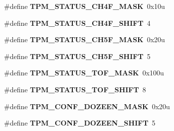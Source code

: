 \begin{DoxyCompactItemize}
\item 
\hypertarget{group___t_p_m___register___masks_ga6d71ec16664cd555736bd39d2b0aef50}{}\#define {\bfseries T\+P\+M\+\_\+\+S\+T\+A\+T\+U\+S\+\_\+\+C\+H4\+F\+\_\+\+M\+A\+S\+K}~0x10u\label{group___t_p_m___register___masks_ga6d71ec16664cd555736bd39d2b0aef50}

\item 
\hypertarget{group___t_p_m___register___masks_gacacfe3eeb25b42db72340d8f7644b293}{}\#define {\bfseries T\+P\+M\+\_\+\+S\+T\+A\+T\+U\+S\+\_\+\+C\+H4\+F\+\_\+\+S\+H\+I\+F\+T}~4\label{group___t_p_m___register___masks_gacacfe3eeb25b42db72340d8f7644b293}

\item 
\hypertarget{group___t_p_m___register___masks_ga0f6acd45c21170be3a793e3fa9107938}{}\#define {\bfseries T\+P\+M\+\_\+\+S\+T\+A\+T\+U\+S\+\_\+\+C\+H5\+F\+\_\+\+M\+A\+S\+K}~0x20u\label{group___t_p_m___register___masks_ga0f6acd45c21170be3a793e3fa9107938}

\item 
\hypertarget{group___t_p_m___register___masks_gaa36c765ce241849df7e9a67665f64493}{}\#define {\bfseries T\+P\+M\+\_\+\+S\+T\+A\+T\+U\+S\+\_\+\+C\+H5\+F\+\_\+\+S\+H\+I\+F\+T}~5\label{group___t_p_m___register___masks_gaa36c765ce241849df7e9a67665f64493}

\item 
\hypertarget{group___t_p_m___register___masks_ga2b3ff7c5c27b1645f2aa20e443bd806c}{}\#define {\bfseries T\+P\+M\+\_\+\+S\+T\+A\+T\+U\+S\+\_\+\+T\+O\+F\+\_\+\+M\+A\+S\+K}~0x100u\label{group___t_p_m___register___masks_ga2b3ff7c5c27b1645f2aa20e443bd806c}

\item 
\hypertarget{group___t_p_m___register___masks_ga5a38aeba334eb7104fc05909881ee482}{}\#define {\bfseries T\+P\+M\+\_\+\+S\+T\+A\+T\+U\+S\+\_\+\+T\+O\+F\+\_\+\+S\+H\+I\+F\+T}~8\label{group___t_p_m___register___masks_ga5a38aeba334eb7104fc05909881ee482}

\item 
\hypertarget{group___t_p_m___register___masks_ga3588ec19d239de2ab13d4305b2beb96a}{}\#define {\bfseries T\+P\+M\+\_\+\+C\+O\+N\+F\+\_\+\+D\+O\+Z\+E\+E\+N\+\_\+\+M\+A\+S\+K}~0x20u\label{group___t_p_m___register___masks_ga3588ec19d239de2ab13d4305b2beb96a}

\item 
\hypertarget{group___t_p_m___register___masks_gad0be3a285e31316fb01fe11d311531d6}{}\#define {\bfseries T\+P\+M\+\_\+\+C\+O\+N\+F\+\_\+\+D\+O\+Z\+E\+E\+N\+\_\+\+S\+H\+I\+F\+T}~5\label{group___t_p_m___register___masks_gad0be3a285e31316fb01fe11d311531d6}


\end{DoxyCompactItemize}
